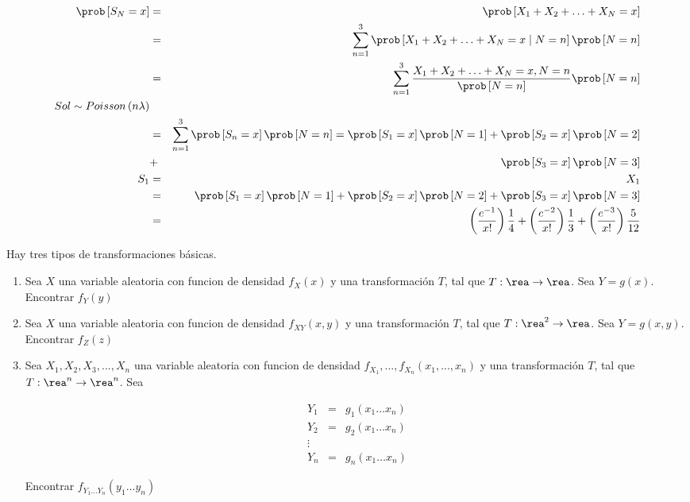 \begin{enumerate}
 \begin{eqnarray*}
 \prob \left[ S_{N} = x \right] &=& \prob \left[ X_{1}+ X_{2}+ \ldots + X_{N} = x\right]\\
 &=& \sum_{n=1}^{3} \prob \left[ X_{1}+ X_{2}+ \ldots + X_{N} = x \mid N=n \right] \prob \left[ N=n \right]\\
 &=&\sum_{n=1}^{3} \dfrac{X_{1}+ X_{2}+ \ldots + X_{N} = x , N=n}{\prob \left[N=n \right] } \prob \left[N=n \right]\\
 Sol \sim Poisson \left(n \lambda \right)\\
 &=& \sum_{n=1}^{3} \prob \left[S_{n}= x \right] \prob \left[ N=n\right]= \prob \left[ S_{1}=x \right] \prob \left[N=1 \right]+ \prob \left[S_{2}= x \right] \prob \left[ N=2 \right]\\ &+& \prob \left[S_{3}= x \right]\prob \left[N=3 \right]\\
 S_{1} &=& X_{1}\\
 &=&\prob \left[S_{1} = x \right] \prob \left[ N=1\right]+ \prob \left[ S_{2}= x \right] \prob \left[N=2 \right] + \prob  \left[S_{3}= x \right]\prob \left[ N=3 \right]\\
 &=& \left( \frac{e^{-1}}{x!}\right)\frac{1}{4}+ \left( \frac{e^{-2}}{x!} \right) \frac{1}{3} + \left( \frac{e^{-3}}{x!} \right) \frac{5}{12}
 \end{eqnarray*}
\end{enumerate}

Hay tres tipos de transformaciones b\'asicas.

\begin{enumerate}
\item Sea $X$ una variable aleatoria con funcion de densidad $f_{X}\left(x\right)$ y una transformaci\'on $T$, tal que $T:\rea\rightarrow\rea$. Sea $Y=g\left(x\right)$. Encontrar $f_{Y}\left(y\right)$

\item Sea $X$ una variable aleatoria con funcion de densidad $f_{XY}\left(x,y\right)$ y una transformaci\'on $T$, tal que $T:\rea^2\rightarrow\rea$. Sea $Y=g\left(x,y\right)$. Encontrar $f_{Z}\left(z\right)$

\item Sea $X_{1}, X_{2}, X_{3},..., X_{n}$ una variable aleatoria con funcion de densidad $f_{X_{1}},...,f_{X_{n}} \left(x_{1},...,x_{n}\right)$ y una transformaci\'on $T$, tal que $T:\rea^n\rightarrow\rea^n$. Sea 

\begin{eqnarray*}
Y_{1}&=&g_{1}\left(x_{1}\ldots x_{n}\right) \\ 
Y_{2}&=&g_{2}\left(x_{1}\ldots x_{n}\right)\\ 
\vdots \\ 
Y_{n}&=&g_{n}\left(x_{1}\ldots x_{n}\right)
\end{eqnarray*}


Encontrar $f_{Y_{1}\ldots Y_{n}}\left(y_{1} \ldots y_{n}\right)$

\end{enumerate}


